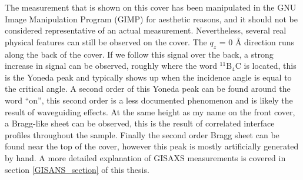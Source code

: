 \documentclass[colophon, english]{phduio}
\def\BC {$^{\textrm{11}}$B$_\textrm{4}$C }
\begin{document}
	The measurement that is shown on this cover has been manipulated in the GNU Image Manipulation Program (GIMP) for aesthetic reasons, and it should not be considered representative of an actual measurement. Nevertheless, several real physical features can still be observed on the cover. The $q_z$ = 0 Å direction runs along the back of the cover. If we follow this signal over the back, a strong increase in signal can be observed, roughly where the word \BC is located, this is the Yoneda peak and typically shows up when the incidence angle is equal to the critical angle. A second order of this Yoneda peak can be found around the word \enquote{on}, this second order is a less documented phenomenon and is likely the result of waveguiding effects. At the same height as my name on the front cover, a Bragg-like sheet can be observed, this is the result of correlated interface profiles throughout the sample. Finally the second order Bragg sheet can be found near the top of the cover, however this peak is mostly artificially generated by hand. A more detailed explanation of GISAXS measurements is covered in section \ref{GISANS_section} of this thesis.
	\frontmatter        %
	
	
	
	    
	\cleardoublepage
	
	
	\tableofcontents    %
	
	\mainmatter         %
	
	
	
	    
	
	
	
	
	
	
	
	
	
	\backmatter         %
	\printbibliography
	    	
	
    
\end{document}
